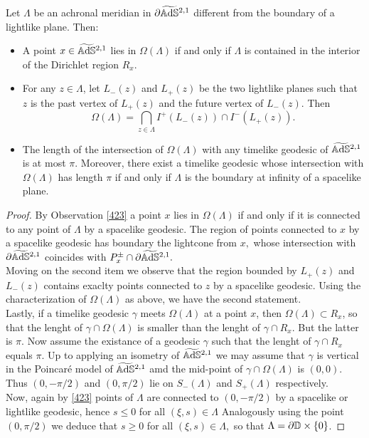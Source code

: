 \begin{proposition}\label{432}
    Let $\Lambda$ be an achronal meridian in $\partial\widetilde{\mathbb{A}\mathrm{d}\mathbb{S}}{}^{2,1}$ different from the boundary of a lightlike plane. Then: 
        \begin{itemize}
            \item A point $x\in\widetilde{\mathbb{A}\mathrm{d}\mathbb{S}}{}^{2,1}$ lies in $\Omega(\Lambda)$ if and only if $\Lambda$ is contained in the interior of the Dirichlet region $R_x$. 
            \item For any $z\in\Lambda$, let $L_-(z)$ and $L_+(z)$ be the two lightlike planes such that $z$ is the past vertex of $L_+(z)$ and the future vertex of $L_-(z)$. Then 
            \[
                \Omega(\Lambda)=\bigcap_{z\in\Lambda}I^+(L_-(z))\cap I^{-}(L_+(z)).
            \] 
            \item The length of the intersection of $\Omega(\Lambda)$ with any timelike geodesic of $\widetilde{\mathbb{A}\mathrm{d}\mathbb{S}}{}^{2,1}$ is at most $\pi.$ Moreover, there exist a timelike geodesic whose intersection with $\Omega(\Lambda)$ has length $\pi$ if and only if $\Lambda$ is the boundary at infinity of a spacelike plane. 
        \end{itemize}
\end{proposition}
\begin{proof}
    By Observation \ref{423} a point $x$ lies in $\Omega(\Lambda)$ if and only if it is connected to any point of $\Lambda$ by a spacelike geodesic. The region of points connected to $x$ by a spacelike geodesic has boundary the lightcone from $x,$ whose intersection with $\partial\widetilde{\mathbb{A}\mathrm{d}\mathbb{S}}{}^{2,1}$ coincides with $P_x^\pm\cap \partial\widetilde{\mathbb{A}\mathrm{d}\mathbb{S}}{}^{2,1}.$\\
    Moving on the second item we observe that the region bounded by $L_+(z)$ and $L_-(z)$ contains exaclty points connected to $z$ by a spacelike geodesic. Using the characterization of $\Omega(\Lambda)$ as above, we have the second statement.   \\
    Lastly, if a timelike geodesic $\gamma$ meets $\Omega(\Lambda)$ at a point $x$, then $\Omega(\Lambda)\subset R_x$, so that the lenght of $\gamma\cap\Omega(\Lambda)$ is smaller than the lenght of $\gamma\cap R_x$. But the latter is $\pi.$ Now assume the existance of a geodesic $\gamma$ such that the lenght of $\gamma\cap R_x$ equals $\pi.$ Up to applying an isometry of $\widetilde{\mathbb{A}\mathrm{d}\mathbb{S}}{}^{2,1}$ we may assume that $\gamma$ is vertical in the Poincaré model of $\widetilde{\mathbb{A}\mathrm{d}\mathbb{S}}{}^{2,1}$ amd the mid-point of $\gamma\cap\Omega(\Lambda)$ is $(0,0)$. Thus $(0,-\pi/2)$ and $(0,\pi/2)$ lie on $S_-(\Lambda)$ and $S_+(\Lambda)$ respectively. \\
    Now, again by \ref{423} points of $\Lambda$ are connected to $(0,-\pi/2)$ by a spacelike or lightlike geodesic, hence $s\leq 0$ for all $(\xi,s)\in\Lambda$ Analogously using the point $(0,\pi/2)$ we deduce that $s\geq 0$ for all $(\xi,s)\in\Lambda,$ so that $\Lambda=\partial\mathbb{D}\times\{0\}$.
\end{proof}

